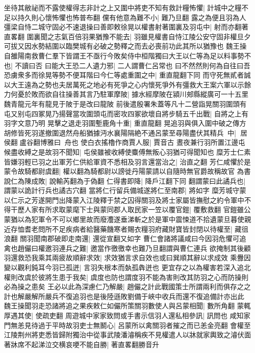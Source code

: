 坐待其敝祕而不露使權得志非計之上又圍中將吏不知有救計糧怖懼|{
	計城中之糧不足以持久則心懷怖懼也怖普布翻}
儻有他意為難不小|{
	難乃旦翻}
露之為便且羽為人彊梁自恃二城守固必不速退操曰善即敕徐晃以權書射著圍裏及羽屯中|{
	射而亦翻著直畧翻}
圍裏聞之志氣百倍羽果猶豫不能去|{
	羽雖見權書自恃江陵公安守固非權旦夕可拔又因水勢結圍以臨樊城有必破之勢釋之而去必喪前功此其所以猶豫也}
魏王操自雒陽南救曹仁羣下皆謂王不亟行今敗矣侍中桓階獨曰大王以仁等為足以料事勢不也|{
	不讀曰否}
曰能大王恐二人遺力邪|{
	二人謂曹仁呂常也}
曰不然然則何為自往曰吾恐虜衆多而徐晃等勢不便耳階曰今仁等處重圍之中|{
	重直龍翻下同}
而守死無貳者誠以大王遠為之勢也夫居萬死之地必有死爭之心内懷死爭外有彊救大王案六軍以示餘力何憂於敗而欲自往操善其言乃駐軍摩陂|{
	據水經摩陂在潁川郟縣縱廣可一十五里魏青龍元年有龍見于陂于是改曰龍陂}
前後遣殷署朱蓋等凡十二營詣晃關羽圍頭有屯又别屯四冢晃乃揚聲當攻圍頭屯而密攻四冢欲壞自將步騎五千出戰|{
	自將之上有羽字文意乃明}
晃擊之退走羽圍塹鹿角十重|{
	重直龍翻}
晃追羽與俱入圍中破之傳方胡修皆死羽遂撤圍退然舟船猶據沔水襄陽隔絶不通呂蒙至尋陽盡伏其精兵中|{
	居侯翻盧谷翻博雅曰舟也}
使白衣搖櫓作商賈人服|{
	賈音古}
晝夜兼行羽所置江邊屯候盡收縛之是故羽不聞知|{
	屯侯雖被收縛使麋傅無叛心羽猶可得聞知也}
糜芳士仁素皆嫌羽輕已羽之出軍芳仁供給軍資不悉相及羽言還當治之|{
	治直之翻}
芳仁咸懼於是蒙令故騎都尉虞翻|{
	權以翻為騎都尉以謗徙丹陽蒙請以自隨時無官爵故稱故官}
為書說仁為陳成敗|{
	說輸芮翻為于偽翻}
仁得書即降|{
	降戶江翻下同}
翻謂蒙曰此譎兵也|{
	謂蒙以詭計行兵也譎古穴翻}
當將仁行留兵備城遂將仁至南郡|{
	將如字}
糜芳城守蒙以仁示之芳遂開門出降蒙入江陵釋于禁之囚得關羽及將士家屬皆撫慰之約令軍中不得干歷人家有所求取蒙麾下士與蒙同郡人取民家一笠以覆官鎧|{
	覆敷救翻}
官鎧雖公蒙猶以為犯軍令不可以鄉里故而廢灋遂垂涕斬之於是軍中震悚道不拾遺蒙旦暮使親近存恤耆老問所不足疾病者給醫藥饑寒者賜衣糧羽府藏財寶皆封閉以待權至|{
	藏徂浪翻}
關羽聞南郡破即走南還|{
	還從宣翻又如字}
曹仁會諸將議咸曰今因羽危懼可追禽也趙儼曰權邀羽連兵之難|{
	邀當作徼徼幸也難乃旦翻謂與曹仁連兵}
欲掩制其後顧羽還救恐我乘其兩疲故順辭求效|{
	求效猶言求自效也或曰巽順其辭以求成效}
乘釁因變以觀利鈍耳今羽已孤迸|{
	言羽失根本而埶孤犇迸也}
更宜存之以為權害若深入追北權則改虞於彼將生患于我矣|{
	虞度也防也謂度羽不能為害則改其防羽之心而防操則必為操之患矣}
王必以此為深慮仁乃解嚴|{
	趙儼之計此戰國策士所謂兩利而俱存之之計也解嚴解所嚴兵不復追羽也是後陸遜敗劉備于峽中收兵而還不復追備計亦出此}
魏王操聞羽走恐諸將追之果疾敕仁如儼所策關羽數使人與呂蒙相聞|{
	數所角翻}
蒙輒厚遇其使|{
	使疏吏翻}
周遊城中家家致問或手書示信羽人還私相參訊|{
	訊問也}
咸知家門無恙見待過于平時故羽吏士無鬭心|{
	呂蒙所以禽關羽者摧之而已恙金亮翻}
會權至江陵荆州將吏悉皆歸附獨治中從事武陵潘濬稱疾不見權遣人以牀就家輿致之濬伏面著牀席不起涕泣交横哀哽不能自勝|{
	著直畧翻勝音升}
